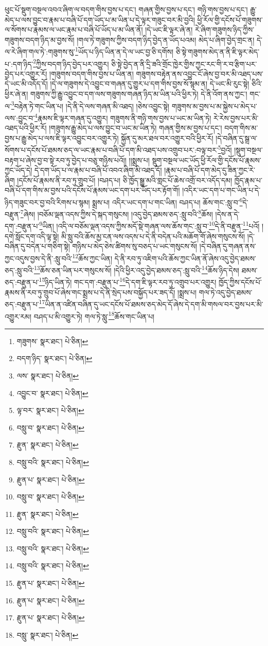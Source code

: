 ཕུང་པོ་སྡུག་བསྔལ་འབའ་ཞིག་ལ་བདག་གིས་བྱས་པ་དང་། གཞན་གྱིས་བྱས་པ་དང་། གཉི་གས་བྱས་པ་དང་། རྒྱུ་མེད་པ་ལས་བྱུང་བ་རྣམ་པ་བཞི་པོ་དག་ཡོད་པ་མ་ཡིན་པ་དེ་ལྟར་གཟུང་བར་མི་བྱའི། ཕྱི་རོལ་གྱི་དངོས་པོ་གཟུགས་ལ་སོགས་པ་རྣམས་ལ་ཡང་རྣམ་པ་བཞི་པོ་ཡོད་པ་མ་ཡིན་ནོ། །དེ་ཡང་ཇི་ལྟར་ཞེ་ན། རེ་ཞིག་གཟུགས་ཉིད་ཀྱིས་གཟུགས་བདག་ཉིད་མ་བྱས་སོ། །གལ་ཏེ་གཟུགས་ཀྱིས་བདག་ཉིད་བྱེད་ན་ཡོད་པའམ། མེད་པ་ཞིག་བྱེད་གྲང་ན། དེ་ལ་རེ་ཞིག་གལ་ཏེ་:གཟུགས་སུ་\footnote{གཟུགས་  སྣར་ཐང་།  པེ་ཅིན། }ཡོད་པ་ཉིད་ཡིན་ན་དེ་ལ་ཡང་བྱ་ཅི་དགོས། ཅི་སྟེ་གཟུགས་མེད་ན་ནི་ཇི་ལྟར་མེད་པ་:དག་ཉིད་\footnote{བདག་ཉིད་  སྣར་ཐང་།  པེ་ཅིན། }ཀྱིས་བདག་ཉིད་བྱེད་པར་འགྱུར། ཅི་སྟེ་བྱེད་ན་ནི་དྲི་ཟའི་གྲོང་ཁྱེར་གྱིས་ཀྱང་རང་གི་ར་བ་རྩིག་པར་བྱེད་པར་འགྱུར་རོ། །གཟུགས་བདག་གིས་བྱས་པ་ཡིན་ན། གཟུགས་བརྟེན་ནས་འབྱུང་ངོ་ཞེས་བྱ་བར་མི་འཐད་པས་དེ་ཡང་མི་འདོད་དོ། །དེ་ལ་གཟུགས་དེ་འབྱུང་བ་གཞན་དུ་གྱུར་པ་དག་གིས་བྱས་སོ་སྙམ་ན། དེ་ཡང་མི་རུང་སྟེ། ཅིའི་ཕྱིར་ཞེ་ན། གཟུགས་ཀྱི་རྒྱུ་འབྱུང་བ་དག་ལས་གཟུགས་གཞན་ཉིད་མ་ཡིན་པའི་ཕྱིར་ཏེ། དེ་ནི་འོག་ནས་ཀྱང་། གང་ལ་\footnote{ལས་  སྣར་ཐང་།  པེ་ཅིན། }བརྟེན་ཏེ་གང་ཡིན་པ། །དེ་ནི་དེ་ལས་གཞན་མི་འཐད། །ཅེས་འབྱུང་སྟེ། གཟུགས་མ་བྱས་པ་མ་སྐྱེས་པ་མེད་པ་ལས་:བྱུང་བ་\footnote{འབྱུང་བ་  སྣར་ཐང་།  པེ་ཅིན། }རྣམས་ཇི་ལྟར་གཞན་དུ་འགྱུར། གཟུགས་ནི་གཉི་གས་བྱས་པ་ཡང་མ་ཡིན་ཏེ། རེ་རེས་བྱས་པར་མི་འཐད་པའི་ཕྱིར་རོ། །གཟུགས་རྒྱུ་མེད་པ་ལས་བྱུང་བ་ཡང་མ་ཡིན་ཏེ། གཞན་གྱིས་མ་བྱས་པ་དང་། བདག་གིས་མ་བྱས་པ་རྒྱུ་མེད་པ་ལས་ཇི་ལྟར་འབྱུང་བར་འགྱུར་ཏེ། སྐྱོན་དུ་མར་ཐལ་བར་འགྱུར་བའི་ཕྱིར་རོ། །དེ་བཞིན་དུ་སྒྲ་ལ་སོགས་པ་དངོས་པོ་ཐམས་ཅད་ལ་ཡང་རྣམ་པ་བཞི་པོ་དག་མི་འཐད་པས་འགྲུབ་པར་:བལྟ་བར་\footnote{ལྟ་བར་  སྣར་ཐང་།  པེ་ཅིན། }བྱའོ། །སྡུག་བསྔལ་བརྟག་པ་ཞེས་བྱ་བ་སྟེ་རབ་ཏུ་བྱེད་པ་བཅུ་གཉིས་པའོ།། །།སྨྲས་པ། སྡུག་བསྔལ་ཡང་ཡོད་ཕྱི་རོལ་གྱི་དངོས་པོ་རྣམས་ཀྱང་ཡོད་དེ། དེ་དག་ཡོད་པ་ལ་རྣམ་པ་བཞི་པོ་འབའ་ཞིག་མི་འཐད་དོ། །རྣམ་པ་བཞི་པོ་དག་མེད་དུ་ཟིན་ཀྱང་རེ་ཞིག །དངོས་པོ་རྣམས་ནི་རབ་ཏུ་གྲུབ་པོ། །བཤད་པ། ཅི་ཁྱོད་སྒྱུ་མའི་གླང་པོ་ཆེས་འགྲོ་བར་འདོད་དམ། ཁྱོད་རྣམ་པ་བཞི་པོ་དག་གིས་མ་བྱས་པའི་དངོས་པོ་རྣམས་ཡང་དག་པར་ཡོད་པར་རྟོག་གོ། །འདིར་ཡང་དག་པ་གང་ཡིན་པ་དེ་ཉིད་གཟུང་བར་བྱ་བའི་རིགས་པ་སྙམ། སྨྲས་པ། འདིར་ཡང་དག་པ་གང་ཡིན། བཤད་པ། ཆོས་གང་:སླུ་བ་\footnote{བསླུ་བ་  སྣར་ཐང་།  པེ་ཅིན། }དེ་བརྫུན་\footnote{རྫུན་  སྣར་ཐང་།  པེ་ཅིན། }ཞེས། །བཅོམ་ལྡན་འདས་ཀྱིས་དེ་སྐད་གསུངས། །འདུ་བྱེད་ཐམས་ཅད་:སླུ་བའི་\footnote{བསླུ་བའི་  སྣར་ཐང་།  པེ་ཅིན། }ཆོས། །དེས་ན་དེ་དག་:བརྫུན་པ་\footnote{རྫུན་པ་  སྣར་ཐང་།  པེ་ཅིན། }ཡིན། །འདི་ལ་བཅོམ་ལྡན་འདས་ཀྱིས་མདོ་སྡེ་གཞན་ལས་ཆོས་གང་:སླུ་བ་\footnote{བསླུ་བ་  སྣར་ཐང་།  པེ་ཅིན། }དེ་ནི་བརྫུན་\footnote{རྫུན་  སྣར་ཐང་།  པེ་ཅིན། }པའོ། །དགེ་སློང་དག་འདི་ལྟ་སྟེ། མི་སླུ་བའི་ཆོས་མྱ་ངན་ལས་འདས་པ་དེ་ནི་བདེན་པའི་མཆོག་གོ་ཞེས་གསུངས་སོ། །དེ་བཞིན་དུ་བདེན་པ་གཅིག་སྟེ། གཉིས་པ་མེད་ཅེས་ཚིགས་སུ་བཅད་པ་ཡང་གསུངས་སོ། །དེ་བཞིན་དུ་གཞན་ནས་ཀྱང་འདུས་བྱས་དེ་ནི་:སླུ་བའི་\footnote{བསླུ་བའི་  སྣར་ཐང་།  པེ་ཅིན། }ཆོས་ཀྱང་ཡིན། དེ་ནི་རབ་ཏུ་འཇིག་པའི་ཆོས་ཀྱང་ཡིན་ནོ་ཞེས་འདུ་བྱེད་ཐམས་ཅད་:སླུ་བའི་\footnote{བསླུ་བའི་  སྣར་ཐང་།  པེ་ཅིན། }ཆོས་ཅན་ཡིན་པར་གསུངས་སོ། །དེའི་ཕྱིར་འདུ་བྱེད་ཐམས་ཅད་:སླུ་བའི་\footnote{བསླུ་བའི་  སྣར་ཐང་།  པེ་ཅིན། }ཆོས་ཉིད་དེས། ཐམས་ཅད་:བརྫུན་པ་\footnote{རྫུན་པ་  སྣར་ཐང་།  པེ་ཅིན། }ཉིད་ཡིན་ཏེ། གང་དག་:བརྫུན་པ་\footnote{རྫུན་པ་  སྣར་ཐང་།  པེ་ཅིན། }དེ་དག་ཇི་ལྟར་རབ་ཏུ་འགྲུབ་པར་འགྱུར། ཁྱོད་ཀྱིས་དངོས་པོ་རྣམས་ནི་རབ་ཏུ་གྲུབ་པོ་ཞེས་གང་སྨྲས་པ་དེ་ནི་སྲེད་པས་བསྐྱོད་པར་ཟད་དོ། །སྨྲས་པ། གལ་ཏེ་འདུ་བྱེད་ཐམས་ཅད་:བརྫུན་པ་\footnote{རྫུན་པ་  སྣར་ཐང་།  པེ་ཅིན། }ཡིན་ན་འཛིན་བཞིན་དུ་ཡང་དངོས་པོ་ཐམས་ཅད་མེད་དོ་ཞེས་དེ་དག་མི་གསལ་བར་བྱས་པར་མི་འགྱུར་རམ། བཤད་པ་མི་འགྱུར་ཏེ། གལ་ཏེ་སླུ་\footnote{བསླུ་  སྣར་ཐང་།  པེ་ཅིན། }ཆོས་གང་ཡིན་པ། 